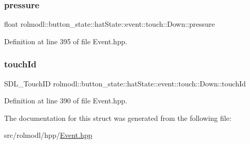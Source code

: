 \subsubsection{\texorpdfstring{pressure}{pressure}}
{\footnotesize\ttfamily float rolmodl\+::button\+\_\+state\+::hat\+State\+::event\+::touch\+::\+Down\+::pressure}



Definition at line 395 of file Event.\+hpp.

\mbox{\label{structrolmodl_1_1button__state_1_1hat_state_1_1event_1_1touch_1_1_down_a069eceddb6181fac467757a5ae824cd0}} 
\subsubsection{\texorpdfstring{touchId}{touchId}}
{\footnotesize\ttfamily S\+D\+L\+\_\+\+Touch\+ID rolmodl\+::button\+\_\+state\+::hat\+State\+::event\+::touch\+::\+Down\+::touch\+Id}



Definition at line 390 of file Event.\+hpp.



The documentation for this struct was generated from the following file\+:\begin{DoxyCompactItemize}
\item 
src/rolmodl/hpp/\mbox{\hyperlink{_event_8hpp}{Event.\+hpp}}\end{DoxyCompactItemize}

